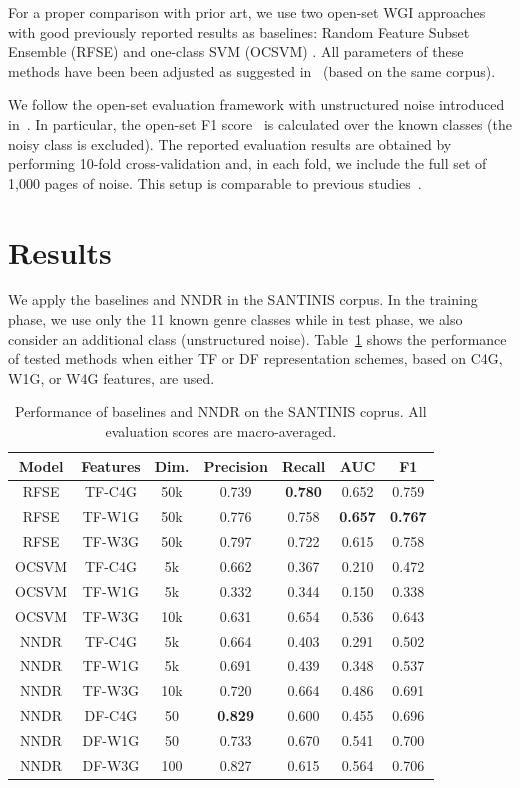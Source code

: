 For a proper comparison with prior art, we use two open-set WGI approaches with good previously reported results as baselines: Random Feature Subset Ensemble (RFSE) and one-class SVM (OCSVM) \cite{pritsos2013open,pritsos2018open}. All parameters of these methods have been been adjusted as suggested in~\cite{pritsos2018open} (based on the same corpus).

We follow the open-set evaluation framework with unstructured noise introduced in~\cite{pritsos2018open}. In particular, the open-set F1 score~\cite{mendesjunior2016} is calculated over the known classes (the noisy class is excluded). The reported evaluation results are obtained by performing 10-fold cross-validation and, in each fold, we include the full set of 1,000 pages of noise. This setup is comparable to previous studies~\cite{pritsos2018open}.

\section{Results}\label{sec:Experiments_Results}

We apply the baselines and NNDR in the SANTINIS corpus. In the training phase, we use only the 11 known genre classes while in test phase, we also consider an additional class (unstructured noise). Table~\ref{tbl:results} shows the performance of tested methods when either TF or DF representation schemes, based on C4G, W1G, or W4G features, are used. 

\begin{table}[t]
\center
\caption {Performance of baselines and NNDR on the SANTINIS coprus. All evaluation scores are macro-averaged.}
\label{tbl:results}
\begin{tabular}{ccccccc}
\hline
Model & Features & Dim. & Precision & Recall & AUC & F1 \\
\hline
RFSE & TF-C4G & 50k & 0.739 & \textbf{0.780} & 0.652 & 0.759 \\
RFSE & TF-W1G & 50k & 0.776 & 0.758 & \textbf{0.657} & \textbf{0.767} \\
RFSE & TF-W3G & 50k & 0.797 & 0.722 & 0.615 & 0.758 \\
OCSVM & TF-C4G & 5k & 0.662 & 0.367 & 0.210 & 0.472\\
OCSVM & TF-W1G & 5k & 0.332 & 0.344 & 0.150 & 0.338\\
OCSVM & TF-W3G & 10k & 0.631 & 0.654 & 0.536 & 0.643\\
NNDR & TF-C4G & 5k & 0.664 & 0.403 & 0.291 & 0.502 \\
NNDR & TF-W1G & 5k & 0.691 & 0.439 & 0.348 & 0.537 \\
NNDR & TF-W3G & 10k & 0.720 & 0.664 & 0.486 & 0.691 \\
NNDR & DF-C4G & 50 & \textbf{0.829} & 0.600 & 0.455 & 0.696 \\
NNDR & DF-W1G & 50 & 0.733 & 0.670 & 0.541 & 0.700 \\
NNDR & DF-W3G & 100 & 0.827 & 0.615 & 0.564 & 0.706 \\
\hline
\end{tabular}
\end{table}

